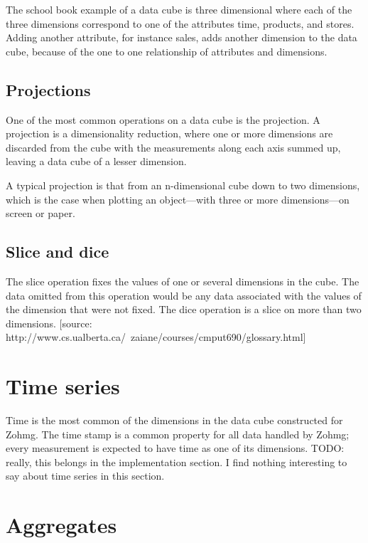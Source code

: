 \documentclass[a4paper,10pt]{book}
\begin{document}
The school book example of a data cube is three dimensional where each of
the three dimensions correspond to one of the attributes time, products,
and stores. Adding another attribute, for instance sales, adds another
dimension to the data cube, because of the one to one relationship of
attributes and dimensions.


\subsection{Projections}

One of the most common operations on a data cube is the projection. A
projection is a dimensionality reduction, where one or more dimensions are
discarded from the cube with the measurements along each axis summed up,
leaving a data cube of a lesser dimension.

A typical projection is that from an n-dimensional cube down to two
dimensions, which is the case when plotting an object---with three or more
dimensions---on screen or paper.


\subsection{Slice and dice}

The slice operation fixes the values of one or several dimensions in the cube.
The data omitted from this operation would be any data associated with the
values of the dimension that were not fixed. The dice operation is a slice on
more than two dimensions. [source:
http://www.cs.ualberta.ca/~zaiane/courses/cmput690/glossary.html]



\section{Time series}

Time is the most common of the dimensions in the data cube constructed for
Zohmg. The time stamp is a common property for all data handled by Zohmg;
every measurement is expected to have time as one of its dimensions. TODO:
really, this belongs in the implementation section. I find nothing interesting
to say about time series in this section.



\section{Aggregates}
\end{document}
